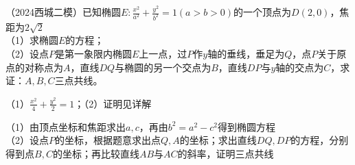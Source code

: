 \begin{example}
（2024西城二模）已知椭圆$E:\frac{x^2}{a^2}+\frac{y^2}{b^2}=1(a > b > 0)$的一个顶点为$D(2, 0)$，焦距为$2\sqrt{2}$\\
（1）求椭圆$E$的方程；\\
（2）设点$P$是第一象限内椭圆$E$上一点，过$P$作$y$轴的垂线，垂足为$Q$，点$P$关于原点的对称点为$A$，直线$DQ$与椭圆的另一个交点为$B$，直线$DP$与$y$轴的交点为$C$，求证：$A, B, C$三点共线。
\end{example}

\begin{corollary*}
（1）$\frac{x^2}{4}+\frac{y^2}{2}=1$；（2）证明见详解

\end{corollary*}

\begin{property}
（1）由顶点坐标和焦距求出$a, c$，再由$b^2 = a^2 - c^2$得到椭圆方程 \\
（2）设点$P$的坐标，根据题意求出点$Q, A$的坐标；求出直线$DQ, DP$的方程，分别得到点$B, C$的坐标；再比较直线$AB$与$AC$的斜率，证明三点共线

\end{property}

